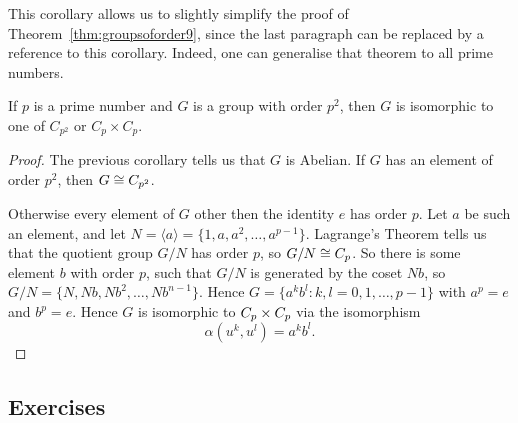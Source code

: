 This corollary allows us to slightly simplify the proof of
Theorem~\ref{thm:groupsoforder9}, since the last paragraph can be replaced
by a reference to this corollary. Indeed, one can generalise that theorem to
all prime numbers.

\begin{theorem}
  If $p$ is a prime number and $G$ is a group with order $p^{2}$, 
  then $G$ is isomorphic to one of $C_{p^{2}}$ or $C_{p} \times C_{p}$.
\end{theorem}

\begin{proof}
  The previous corollary tells us that $G$ is Abelian.  If $G$ has an
  element of order $p^{2}$, then $G \cong C_{p^{2}}$.
  
  Otherwise every element of $G$ other then the identity $e$ has order $p$. 
  Let $a$ be such an element, and let $N = \langle a \rangle = \{1, a, a^{2},
  \ldots, a^{p-1}\}$. Lagrange's Theorem tells us that the quotient group $G/N$
  has order $p$, so $G/N \cong C_{p}$.  So there is some element $b$ with
  order $p$, such that $G/N$ is generated by the coset $Nb$, so $G/N = \{N, Nb,
  Nb^{2}, \ldots, Nb^{n-1}\}$.  Hence $G = \{a^{k}b^{l} : k, l = 0, 1, \ldots,
  p-1\}$ with $a^{p} = e$ and $b^{p} = e$.  Hence $G$ is isomorphic to
  $C_{p} \times C_{p}$ via the isomorphism
  \[
    \alpha(u^{k},u^{l}) = a^{k}b^{l}.
  \]
\end{proof}



\subsection*{Exercises}

